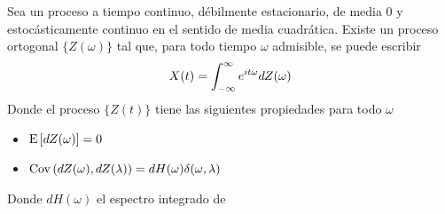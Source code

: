\begin{teorema}
Sea \xt un proceso a tiempo continuo, débilmente estacionario, de media 0 y estocásticamente continuo en el sentido de media cuadrática. Existe un proceso ortogonal $\{Z(\omega)\}$ tal que, para todo tiempo $\omega$ admisible, se puede escribir
\begin{equation*}
X(t) = \int_{-\infty}^{\infty} e^{i t \omega} dZ(\omega)
\end{equation*}
Donde el proceso $\{Z(t)\}$ tiene las siguientes propiedades para todo $\omega$
\begin{itemize}
\item $\mathrm{E}\left[ dZ(\omega) \right] = 0$
\item $\mathrm{Cov}\left( dZ(\omega),dZ(\lambda) \right) = dH(\omega) \delta(\omega, \lambda)$
\end{itemize}
Donde $dH(\omega)$ el espectro integrado de \xt
\label{rep_espectral}
\end{teorema}


